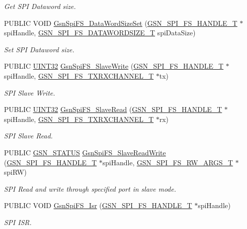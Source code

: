 \begin{DoxyCompactItemize}
\begin{DoxyCompactList}\small\item\em Get SPI Dataword size. \end{DoxyCompactList}\item 
PUBLIC VOID \hyperlink{a00655_gaf3726da0e724d957640dccf06690dcb5}{GsnSpiFS\_\-DataWordSizeSet} (\hyperlink{a00234}{GSN\_\-SPI\_\-FS\_\-HANDLE\_\-T} $\ast$spiHandle, \hyperlink{a00655_gaad2f137ab7bba85003348a4b895e435d}{GSN\_\-SPI\_\-FS\_\-DATAWORDSIZE\_\-T} spiDataSize)
\begin{DoxyCompactList}\small\item\em Set SPI Dataword size. \end{DoxyCompactList}\item 
PUBLIC \hyperlink{a00660_gae1e6edbbc26d6fbc71a90190d0266018}{UINT32} \hyperlink{a00655_ga08002b3f127d297a7cf861236e16b5d2}{GsnSpiFS\_\-SlaveWrite} (\hyperlink{a00234}{GSN\_\-SPI\_\-FS\_\-HANDLE\_\-T} $\ast$spiHandle, \hyperlink{a00237}{GSN\_\-SPI\_\-FS\_\-TXRXCHANNEL\_\-T} $\ast$tx)
\begin{DoxyCompactList}\small\item\em SPI Slave Write. \end{DoxyCompactList}\item 
PUBLIC \hyperlink{a00660_gae1e6edbbc26d6fbc71a90190d0266018}{UINT32} \hyperlink{a00655_ga9150e0bedd31d99fc844282242e4d844}{GsnSpiFS\_\-SlaveRead} (\hyperlink{a00234}{GSN\_\-SPI\_\-FS\_\-HANDLE\_\-T} $\ast$spiHandle, \hyperlink{a00237}{GSN\_\-SPI\_\-FS\_\-TXRXCHANNEL\_\-T} $\ast$rx)
\begin{DoxyCompactList}\small\item\em SPI Slave Read. \end{DoxyCompactList}\item 
PUBLIC \hyperlink{a00660_gada5951904ac6110b1fa95e51a9ddc217}{GSN\_\-STATUS} \hyperlink{a00655_gad34396a6807c38a140af6fbf0cdd1bc4}{GsnSpiFS\_\-SlaveReadWrite} (\hyperlink{a00234}{GSN\_\-SPI\_\-FS\_\-HANDLE\_\-T} $\ast$spiHandle, \hyperlink{a00235}{GSN\_\-SPI\_\-FS\_\-RW\_\-ARGS\_\-T} $\ast$spiRW)
\begin{DoxyCompactList}\small\item\em SPI Read and write through specified port in slave mode. \end{DoxyCompactList}\item 
PUBLIC VOID \hyperlink{a00655_gaad41750a0d70bcd3f0b7db9760e47391}{GsnSpiFS\_\-Isr} (\hyperlink{a00234}{GSN\_\-SPI\_\-FS\_\-HANDLE\_\-T} $\ast$spiHandle)
\begin{DoxyCompactList}\small\item\em SPI ISR. \end{DoxyCompactList}\item 

\end{DoxyCompactItemize}
